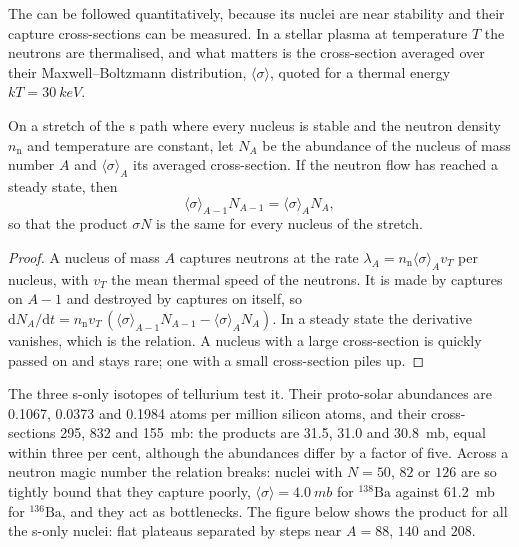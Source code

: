 The  can be followed quantitatively, because its nuclei are
near stability and their capture cross-sections can be measured. In a
stellar plasma at temperature $T$ the neutrons are thermalised, and what
matters is the cross-section averaged over their Maxwell--Boltzmann
distribution, $\langle\sigma\rangle$, quoted for a thermal energy
$kT = \qty{30}{keV}$.

\begin{proposition}\label{prop:b3:origin-of-elements:sigma-n}
On a stretch of the s path where every nucleus is stable and the neutron
density $n_\mathrm{n}$ and temperature are constant, let $N_A$ be the
abundance of the nucleus of mass number $A$ and $\langle\sigma\rangle_A$
its averaged cross-section. If the neutron flow has reached a steady
state, then
\[
\langle\sigma\rangle_{A-1} N_{A-1} = \langle\sigma\rangle_A N_A ,
\]
so that the product $\sigma N$ is the same for every nucleus of the
stretch.
\end{proposition}

\begin{proof}
A nucleus of mass $A$ captures neutrons at the rate
$\lambda_A = n_\mathrm{n}\langle\sigma\rangle_A v_T$ per nucleus, with
$v_T$ the mean thermal speed of the neutrons. It is made by captures on
$A - 1$ and destroyed by captures on itself, so
$\mathrm{d}N_A/\mathrm{d}t = n_\mathrm{n} v_T\,(\langle\sigma\rangle_{A-1}
N_{A-1} - \langle\sigma\rangle_A N_A)$. In a steady state the derivative
vanishes, which is the relation. A nucleus with a large cross-section is
quickly passed on and stays rare; one with a small cross-section piles
up.
\end{proof}

The three s-only isotopes of tellurium test it. Their proto-solar
abundances are \num{0.1067}, \num{0.0373} and \num{0.1984} atoms per
million silicon atoms, and their cross-sections \num{295}, \num{832} and
\qty{155}{mb}: the products are \num{31.5}, \num{31.0} and
\qty{30.8}{mb}, equal within three per cent, although the abundances
differ by a factor of five. Across a neutron magic number the relation
breaks: nuclei with $N = 50$, $82$ or $126$ are so tightly bound that
they capture poorly, $\langle\sigma\rangle = \qty{4.0}{mb}$ for
$^{138}\mathrm{Ba}$ against \qty{61.2}{mb} for $^{136}\mathrm{Ba}$, and
they act as bottlenecks. The figure below shows the product for all the
s-only nuclei: flat plateaus separated by steps near $A = 88$, $140$
and $208$.

